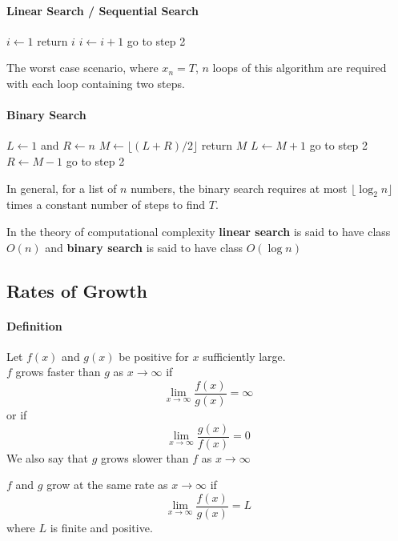 \documentclass[12pt]{article}
\begin{document}
\paragraph{Linear Search / Sequential Search} 
\begin{algorithmic}[1]
    \State $i \gets 1$
        \State return $i$
    \Else
        \State $i \gets i + 1$
        \State go to step 2
    \EndIf 
\end{algorithmic}

The worst case scenario, where $x_n = T$, $n$ loops of this algorithm are required with each loop containing two steps.

\paragraph{Binary Search} 
\begin{algorithmic}[1]
    \State $L \gets 1$ and $R \gets n$
    \State $M \gets \lfloor (L + R)/2 \rfloor$
        \State return $M$
    \Else
            \State $L \gets M + 1$
            \State go to step 2
        \EndIf
            \State $R \gets M - 1$
            \State go to step 2
        \EndIf
    \EndIf 
\end{algorithmic}
In general, for a list of $n$ numbers, the binary search requires at most $\lfloor \log_2 n \rfloor$ times a constant number of steps to find $T$.

\noindent
In the theory of computational complexity \textbf{linear search} is said to have class $O(n)$ and \textbf{binary search} is said
to have class $O(\log n)$
\subsection{Rates of Growth}
\paragraph{Definition} Let $f(x)$ and $g(x)$ be positive for $x$ sufficiently large. \\
$f$ grows faster than $g$ as $x \to \infty$ if 
\[
    \lim_{x \to \infty} \frac{f(x)}{g(x)} = \infty 
\]
or if
\[
    \lim_{x \to \infty} \frac{g(x)}{f(x)} = 0 
\]
We also say that $g$ grows slower than $f$ as $x \to \infty$

\noindent
$f$ and $g$ grow at the same rate as $x \to \infty$ if 
\[
    \lim_{x \to \infty} \frac{f(x)}{g(x)} = L 
\]
where $L$ is finite and positive.
\end{document}
